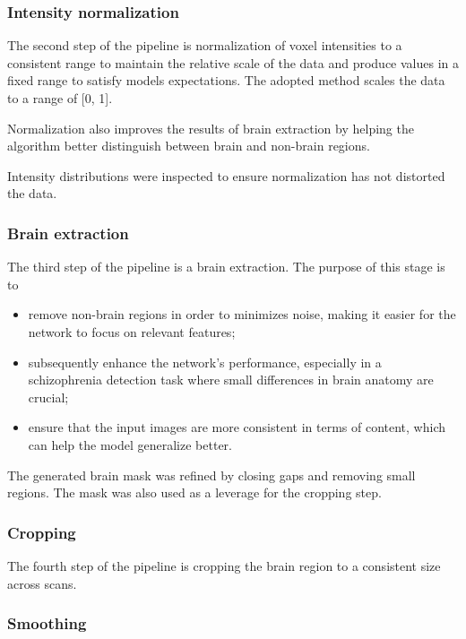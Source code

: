 \subsubsection{Intensity normalization}

The second step of the pipeline is normalization of voxel intensities to a consistent range to maintain the relative scale of the data and produce values in a fixed range to satisfy models expectations. The adopted method scales the data to a range of [0, 1].

Normalization also improves the results of brain extraction by helping the algorithm better distinguish between brain and non-brain regions.

Intensity distributions were inspected to ensure normalization has not distorted the data.

\subsubsection{Brain extraction}

The third step of the pipeline is a brain extraction. The purpose of this stage is to
\begin{itemize}
    \item remove non-brain regions in order to minimizes noise, making it easier for the network to focus on relevant features;
    \item subsequently enhance the network's performance, especially in a schizophrenia detection task where small differences in brain anatomy are crucial;
    \item ensure that the input images are more consistent in terms of content, which can help the model generalize better.
\end{itemize}

The generated brain mask was refined by closing gaps and removing small regions. The mask was also used as a leverage for the cropping step.

\subsubsection{Cropping}

The fourth step of the pipeline is cropping the brain region to a consistent size across scans.

\subsubsection{Smoothing}

